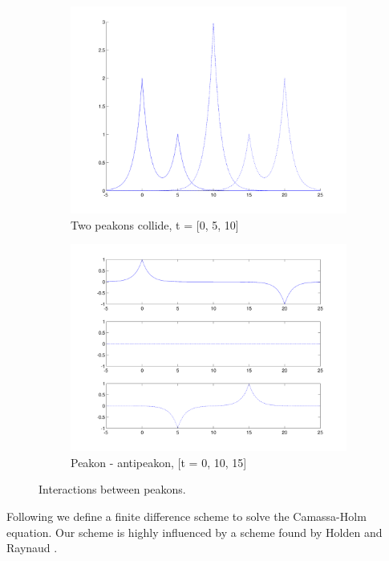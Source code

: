 \begin{figure}[h]
\begin{subfigure}[b]{0.49\textwidth}
                \includegraphics[width=\textwidth]{gfx/peakonovertake}
                \caption{Two peakons collide, t = [0, 5, 10]}
                \label{fig:peakonovertake}
        \end{subfigure}
        \begin{subfigure}[b]{0.49\textwidth}
                \includegraphics[width=\textwidth]{gfx/peakonantipeakon}
                \caption{Peakon - antipeakon, [t = 0, 10, 15]}
                \label{fig:peakonantipeakon}
        \end{subfigure}
        \caption{Interactions between peakons.}
\end{figure}

Following we define a finite difference scheme to solve the Camassa-Holm equation. Our scheme is highly influenced by a scheme found by Holden and Raynaud \cite{holden2006convergence}.
